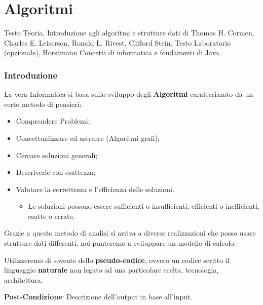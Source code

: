\documentclass[twocolumn]{article}
\begin{document}
\tableofcontents
\clearpage


\part{Algoritmi}
Testo Teoria, Introduzione agli algoritmi e strutture dati di Thomas H. Cormen, Charles E. Leiserson, Ronald L. Rivest, Clifford Stein.
\newline Testo Laboratorio (opzionale), Horstmann Concetti di informatica e fondamenti di Java.
\section{Introduzione}
La vera Informatica si basa sullo sviluppo degli \textbf{Algoritmi} caratterizzato da un certo metodo di pensieri: \begin{itemize}
    \item Comprendere Problemi;
    \item Concettualizzare ed astrarre (Algoritmi grafi);
    \item Cercare soluzioni generali;
    \item Descriverle con esattezza;
    \item Valutare la correttezza e l'efficienza delle soluzioni.\begin{itemize}
        \item Le soluzioni possono essere sufficienti o insufficienti, efficienti o inefficienti, esatte o errate. 
    \end{itemize}
\end{itemize}
Grazie a questo metodo di analisi si arriva a diverse realizzazioni che posso usare strutture dati differenti, noi punteremo a sviluppare un modello di calcolo.

Utilizzeremo di sovente dello \textbf{pseudo-codice}, ovvero un codice scritto il linguaggio \textbf{naturale} non legato ad una particolare scelta, tecnologia, architettura. 

\textbf{Post-Condizione}: Descrizione dell'output in base all'input.
\end{document}
